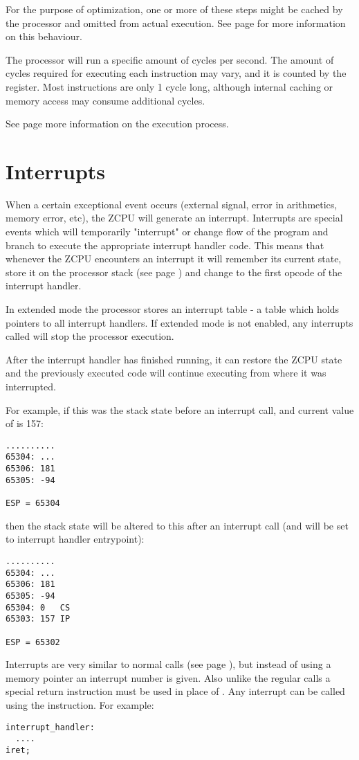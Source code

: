 For the purpose of optimization, one or more of these steps might be cached by the processor and omitted from actual execution. See page \pageref{caching} for more information on this behaviour.

The processor will run a specific amount of cycles per second. The amount of cycles required for executing each instruction may vary, and it is counted by the  register. Most instructions are only 1 cycle long, although internal caching or memory access may consume additional cycles.

See page \pageref{advexecution} more information on the execution process.

\section{Interrupts}
When a certain exceptional event occurs (external signal, error in arithmetics, memory error, etc), the ZCPU will generate an interrupt. Interrupts are special events which will temporarily "interrupt" or change flow of the program and branch to execute the appropriate interrupt handler code. This means that whenever the ZCPU encounters an interrupt it will remember its current state, store it on the processor stack (see page \pageref{stack}) and change  to the first opcode of the interrupt handler.

In extended mode the processor stores an interrupt table - a table which holds pointers to all interrupt handlers. If extended mode is not enabled, any interrupts called will stop the processor execution.

After the interrupt handler has finished running, it can restore the ZCPU state and the previously executed code will continue executing from where it was interrupted.

For example, if this was the stack state before an interrupt call, and current value of  is 157:
\begin{verbatim}
..........
65304: ...
65306: 181
65305: -94

ESP = 65304
\end{verbatim}
then the stack state will be altered to this after an interrupt call (and  will be set to interrupt handler entrypoint):
\begin{verbatim}
..........
65304: ...
65306: 181
65305: -94
65304: 0   CS
65303: 157 IP

ESP = 65302
\end{verbatim}

Interrupts are very similar to normal calls (see page \pageref{branching}), but instead of using a memory pointer an interrupt number is given. Also unlike the regular calls a special return instruction  must be used in place of . Any interrupt can be called using the  instruction. For example:
\begin{verbatim}
interrupt_handler:
  ....
iret;
\end{verbatim}

